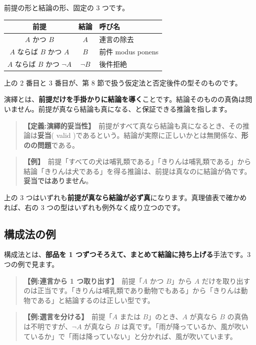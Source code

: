 \documentclass{article}
\begin{document}
前提の形と結論の形、固定の 3 つです。

\begin{center}
\begin{tabular}{|c|c|l|}
\hline
前提 & 結論 & 呼び名 \\
\hline
\(A\) かつ \(B\) & \(A\) & 連言の除去 \\
\(A\) ならば \(B\) かつ \(A\) & \(B\) & 前件 modus ponens \\
\(A\) ならば \(B\) かつ \(\neg A\) & \(\neg B\) & 後件拒絶 \\
\hline
\end{tabular}
\end{center}

上の 2 番目と 3 番目が、第 8 節で扱う仮定法と否定後件の型そのものです。

演繹とは、\textbf{前提だけを手掛かりに結論を導く}ことです。結論そのものの真偽は問いません。前提が真なら結論も真になる、と保証できる推論を指します。

\begin{quote}
\textbf{【定義:演繹的妥当性】}\ 前提がすべて真なら結論も真になるとき、その推論は\textbf{妥当}( valid )であるという。結論が実際に正しいかとは無関係な、\textbf{形のの問題}である。
\end{quote}

\begin{quote}
\textbf{【例】}\ 前提「すべての犬は哺乳類である」「きりんは哺乳類である」から結論「きりんは犬である」を得る推論は、前提は真なのに結論が偽です。\textbf{妥当ではありません}。
\end{quote}

上の 3 つはいずれも\textbf{前提が真なら結論が必ず真}になります。真理値表で確かめれば、右の 3 つの型はいずれも例外なく成り立つのです。

\subsection{構成法の例}

構成法とは、\textbf{部品を 1 つずつそろえて、まとめて結論に持ち上げる}手法です。3 つの例で見ます。

\begin{quote}
\textbf{【例:連言から 1 つ取り出す】}\ 前提「\(A\) かつ \(B\)」から \(A\) だけを取り出すのは正当です。「きりんは哺乳類であり動物でもある」から「きりんは動物である」と結論するのは正しい型です。
\end{quote}

\begin{quote}
\textbf{【例:選言を分ける】}\ 前提「\(A\) または \(B\)」のとき、\(A\) が真なら \(B\) の真偽は不明ですが、\(\neg A\) が真なら \(B\) は真です。「雨が降っているか、風が吹いているか」で「雨は降っていない」と分かれば、風が吹いています。
\end{quote}
\end{document}
